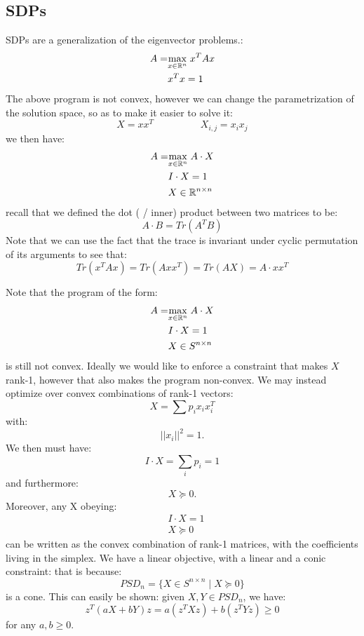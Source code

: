 \documentclass[11pt]{article}
\begin{document}
\subsection*{SDPs}
SDPs are a generalization of the eigenvector problems.:
\begin{align*}
    A = &\underset{x\in \mathbb{R}^n}{\max}\; x^TAx\\
    & x^Tx =1
\end{align*}
The above program is not convex, however we can change the parametrization of the solution space, so as to make it easier to solve it:
\[
    X = xx^T \hspace{2cm} X_{i,j} = x_i x_j
\]
we then have:
\begin{align*}
    A = &\underset{x\in \mathbb{R}^n}{\max}\; A \cdot X\\
    & I \cdot X  = 1\\
    &X \in \mathbb{R}^{n \times n}
\end{align*}
recall that we defined the dot ( / inner) product between two matrices to be:
\[
    A \cdot B = Tr(A^TB)
\]
Note that we can use the fact that the trace is invariant under cyclic permutation of its arguments to see that:
\[
    Tr(x^TAx) = Tr(Axx^T) = Tr(AX) = A \cdot xx^T 
\]

Note that the program of the form:
\begin{align*}
    A = &\underset{x\in \mathbb{R}^n}{\max}\; A \cdot X\\
    & I \cdot X  = 1\\
    &X \in S^{n \times n}
\end{align*}
is still not convex. Ideally we would like to enforce a constraint that makes $X$ rank-1, however that also makes the program non-convex. We may instead optimize over convex combinations of rank-1 vectors:
\[
    X = \sum p_i x_ix_i^T
\]
with:
\[
    ||x_i||^2 = 1.
\]
We then must have:
\[
    I \cdot X = \sum_{i}p_i = 1
\]
and furthermore:
\[
    X \succeq 0.
\]
Moreover, any X obeying:
\begin{align*}
    &I \cdot X  = 1\\
    &X \succeq 0
\end{align*}
can be written as the convex combination of rank-1 matrices, with the coefficients living in the simplex. We have a linear objective, with a linear and a conic constraint: that is because:
\[
    PSD_n = \{X \in S^{n \times n} \mid X \succeq 0\}
\]
is a cone. This can easily be shown: given $X,Y \in PSD_n$, we have:
\[
    z^T(aX+bY)z = a(z^TXz) + b(z^TYz) \geq 0
\]
 for any $a,b \geq 0$.\\
 
\end{document}
